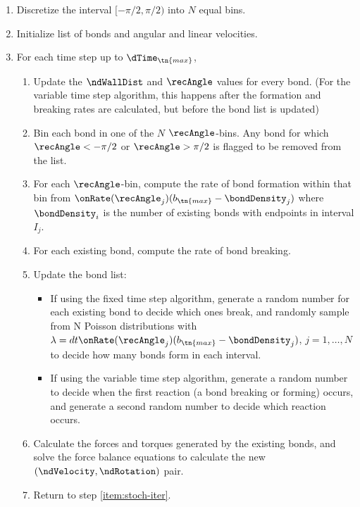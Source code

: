 \begin{enumerate}
\item Discretize the interval $[-\pi/2, \pi/2)$ into $N$ equal bins.
\item Initialize list of bonds and angular and linear velocities. 
\item For each time step up to $\dTime_\tn{max}$, \label{item:stoch-iter}
  \begin{enumerate}
  \item Update the $\ndWallDist$ and $\recAngle$ values for every bond. (For the
    variable time step algorithm, this happens after the formation and
    breaking rates are calculated, but before the bond list is updated)
  \item Bin each bond in one of the $N$ $\recAngle$-bins. Any bond for
    which $\recAngle < -\pi/2$ or $\recAngle > \pi/2$ is flagged to be
    removed from the list.
  \item For each $\recAngle$-bin, compute the rate of bond formation
    within that bin from $\onRate(\recAngle_j) (b_\tn{max} - \bondDensity_j)$ where
    $\bondDensity_i$ is the number of existing bonds with endpoints in interval
    $I_j$.
  \item For each existing bond, compute the rate of bond breaking.
  \item Update the bond list:
    \begin{itemize}
    \item If using the fixed time step algorithm, generate a random
      number for each existing bond to decide which ones break, and
      randomly sample from N Poisson distributions with $\lambda = dt
      \onRate(\recAngle_j) (b_\tn{max} - \bondDensity_j)$, $j = 1, \hdots, N$ to
      decide how many bonds form in each interval.
    \item If using the variable time step algorithm, generate a random
      number to decide when the first reaction (a bond breaking or
      forming) occurs, and generate a second random number to decide
      which reaction occurs.
    \end{itemize}
  \item Calculate the forces and torques generated by the existing
    bonds, and solve the force balance equations to calculate the new
    $(\ndVelocity, \ndRotation)$ pair.
  \item Return to step \ref{item:stoch-iter}.
  \end{enumerate}
\end{enumerate}
